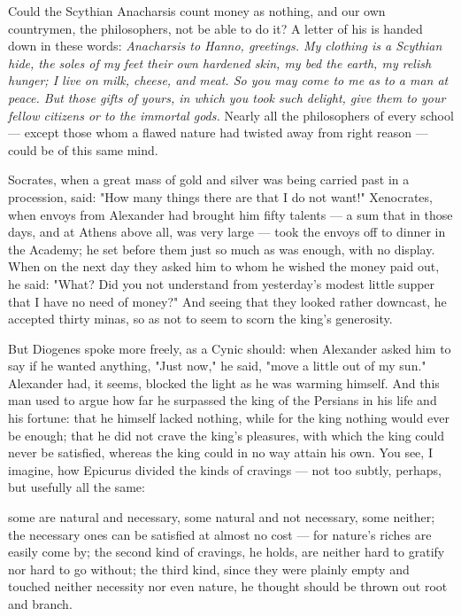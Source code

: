  Could the Scythian Anacharsis count money as nothing, and our own countrymen, the philosophers, not be able to do it? A letter of his is handed down in these words: \textit{Anacharsis to Hanno, greetings. My clothing is a Scythian hide, the soles of my feet their own hardened skin, my bed the earth, my relish hunger; I live on milk, cheese, and meat. So you may come to me as to a man at peace. But those gifts of yours, in which you took such delight, give them to your fellow citizens or to the immortal gods.} Nearly all the philosophers of every school — except those whom a flawed nature had twisted away from right reason — could be of this same mind.

 Socrates, when a great mass of gold and silver was being carried past in a procession, said: "How many things there are that I do not want!" Xenocrates, when envoys from Alexander had brought him fifty talents — a sum that in those days, and at Athens above all, was very large — took the envoys off to dinner in the Academy; he set before them just so much as was enough, with no display. When on the next day they asked him to whom he wished the money paid out, he said: "What? Did you not understand from yesterday's modest little supper that I have no need of money?" And seeing that they looked rather downcast, he accepted thirty minas, so as not to seem to scorn the king's generosity.

 But Diogenes spoke more freely, as a Cynic should: when Alexander asked him to say if he wanted anything, "Just now," he said, "move a little out of my sun." Alexander had, it seems, blocked the light as he was warming himself. And this man used to argue how far he surpassed the king of the Persians in his life and his fortune: that he himself lacked nothing, while for the king nothing would ever be enough; that he did not crave the king's pleasures, with which the king could never be satisfied, whereas the king could in no way attain his own. You see, I imagine, how Epicurus divided the kinds of cravings — not too subtly, perhaps, but usefully all the same:

 some are natural and necessary, some natural and not necessary, some neither; the necessary ones can be satisfied at almost no cost — for nature's riches are easily come by; the second kind of cravings, he holds, are neither hard to gratify nor hard to go without; the third kind, since they were plainly empty and touched neither necessity nor even nature, he thought should be thrown out root and branch.

